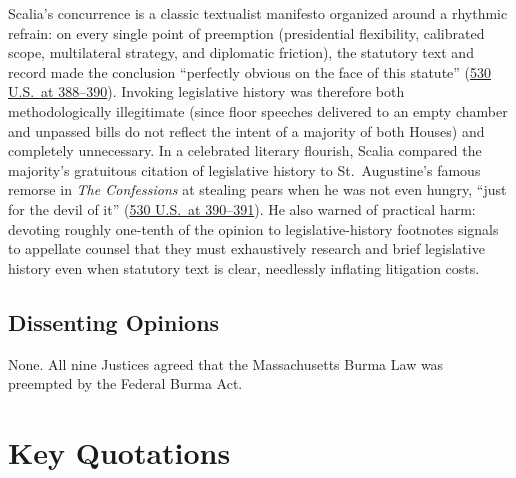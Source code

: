 \documentclass[12pt]{article}
\begin{document}
Scalia's concurrence is a classic textualist manifesto organized around a rhythmic refrain: on every single point of preemption (presidential flexibility, calibrated scope, multilateral strategy, and diplomatic friction), the statutory text and record made the conclusion ``perfectly obvious on the face of this statute'' (\href{https://www.law.cornell.edu/supct/html/99-474.ZC.html}{530 U.S.\ at 388--390}). Invoking legislative history was therefore both methodologically illegitimate (since floor speeches delivered to an empty chamber and unpassed bills do not reflect the intent of a majority of both Houses) and completely unnecessary. In a celebrated literary flourish, Scalia compared the majority's gratuitous citation of legislative history to St.\ Augustine's famous remorse in \textit{The Confessions} at stealing pears when he was not even hungry, ``just for the devil of it'' (\href{https://www.law.cornell.edu/supct/html/99-474.ZC.html}{530 U.S.\ at 390--391}). He also warned of practical harm: devoting roughly one-tenth of the opinion to legislative-history footnotes signals to appellate counsel that they must exhaustively research and brief legislative history even when statutory text is clear, needlessly inflating litigation costs.

\subsection{Dissenting Opinions}
None. All nine Justices agreed that the Massachusetts Burma Law was preempted by the Federal Burma Act.

\section{Key Quotations}
\end{document}
